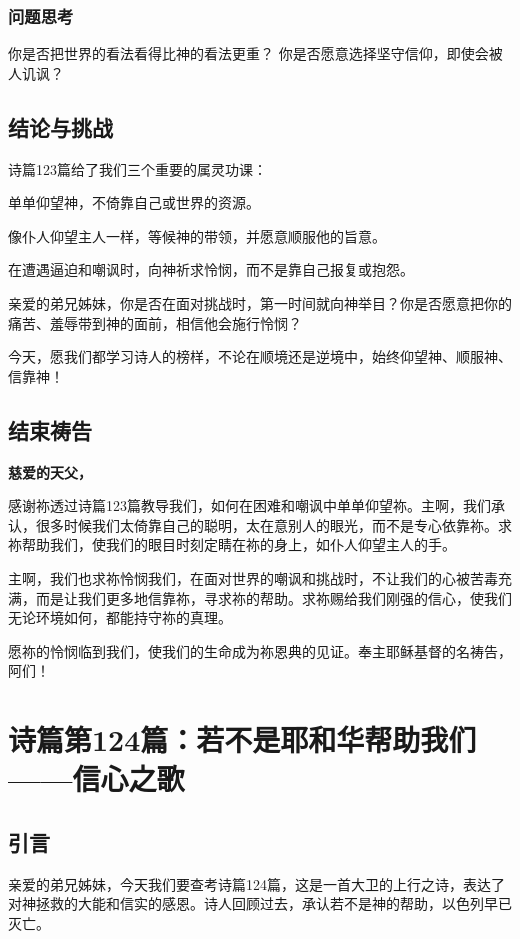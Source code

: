 \documentclass[a4paper, 12pt]{article}
\begin{document}
\subsubsection*{问题思考}
你是否把世界的看法看得比神的看法更重？
你是否愿意选择坚守信仰，即使会被人讥讽？
\subsection*{结论与挑战}
诗篇123篇给了我们三个重要的属灵功课：

单单仰望神，不倚靠自己或世界的资源。

像仆人仰望主人一样，等候神的带领，并愿意顺服他的旨意。

在遭遇逼迫和嘲讽时，向神祈求怜悯，而不是靠自己报复或抱怨。

亲爱的弟兄姊妹，你是否在面对挑战时，第一时间就向神举目？你是否愿意把你的痛苦、羞辱带到神的面前，相信他会施行怜悯？

今天，愿我们都学习诗人的榜样，不论在顺境还是逆境中，始终仰望神、顺服神、信靠神！

\subsection*{结束祷告}
\textbf{慈爱的天父，}

感谢祢透过诗篇123篇教导我们，如何在困难和嘲讽中单单仰望祢。主啊，我们承认，很多时候我们太倚靠自己的聪明，太在意别人的眼光，而不是专心依靠祢。求祢帮助我们，使我们的眼目时刻定睛在祢的身上，如仆人仰望主人的手。

主啊，我们也求祢怜悯我们，在面对世界的嘲讽和挑战时，不让我们的心被苦毒充满，而是让我们更多地信靠祢，寻求祢的帮助。求祢赐给我们刚强的信心，使我们无论环境如何，都能持守祢的真理。

愿祢的怜悯临到我们，使我们的生命成为祢恩典的见证。奉主耶稣基督的名祷告，阿们！
\newpage
\section{诗篇第124篇：若不是耶和华帮助我们——信心之歌}
\subsection*{引言}
\hspace{0.6cm}亲爱的弟兄姊妹，今天我们要查考诗篇124篇，这是一首大卫的上行之诗，表达了对神拯救的大能和信实的感恩。诗人回顾过去，承认若不是神的帮助，以色列早已灭亡。
\end{document}
